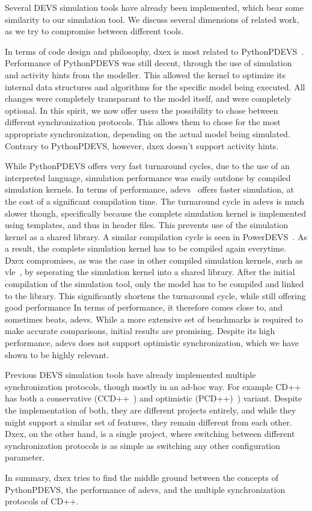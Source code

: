 Several \textsf{DEVS} simulation tools have already been implemented, which bear some similarity to our simulation tool.
We discuss several dimensions of related work, as we try to compromise between different tools.

In terms of code design and philosophy, dxex is most related to PythonPDEVS~\cite{PythonPDEVS}.
Performance of PythonPDEVS was still decent, through the use of simulation and activity hints from the modeller.
This allowed the kernel to optimize its internal data structures and algorithms for the specific model being executed.
All changes were completely transparant to the model itself, and were completely optional.
In this spirit, we now offer users the possibility to chose between different synchronization protocols.
This allows them to chose for the most appropriate synchronization, depending on the actual model being simulated.
Contrary to PythonPDEVS, however, dxex doesn't support activity hints.

While PythonPDEVS offers very fast turnaround cycles, due to the use of an interpreted language, simulation performance was easily outdone by compiled simulation kernels.
In terms of performance, adevs~\cite{adevs} offers faster simulation, at the cost of a significant compilation time.
The turnaround cycle in adevs is much slower though, specifically because the complete simulation kernel is implemented using templates, and thus in header files.
This prevents use of the simulation kernel as a shared library.
A similar compilation cycle is seen in PowerDEVS~\cite{PowerDEVS}.
As a result, the complete simulation kernel has to be compiled again everytime.
Dxex compromises, as was the case in other compiled simulation kernels, such as vle~\cite{vle}, by seperating the simulation kernel into a shared library.
After the initial compilation of the simulation tool, only the model has to be compiled and linked to the library.
This significantly shortens the turnaround cycle, while still offering good performance
In terms of performance, it therefore comes close to, and sometimes beats, adevs.
While a more extensive set of benchmarks is required to make accurate comparisons, initial results are promising.
Despite its high performance, adevs does not support optimistic synchronization, which we have shown to be highly relevant.

Previous \textsf{DEVS} simulation tools have already implemented multiple synchronization protocols, though mostly in an ad-hoc way.
For example CD++~\cite{CD++} has both a conservative (CCD++~\cite{CCD++}) and optimistic (PCD++)~\cite{PCD++}) variant.
Despite the implementation of both, they are different projects entirely, and while they might support a similar set of features, they remain different from each other.
Dxex, on the other hand, is a single project, where switching between different synchronization protocols is as simple as switching any other configuration parameter.

In summary, dxex tries to find the middle ground between the concepts of PythonPDEVS, the performance of adevs, and the multiple synchronization protocols of CD++.
